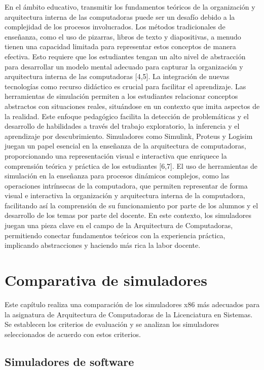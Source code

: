 \documentclass[12pt,twoside]{templates/unerthesis}
\begin{document}
En el ámbito educativo, transmitir los fundamentos teóricos de la organización y arquitectura interna de las computadoras puede ser un desafío debido a la complejidad de los procesos involucrados. Los métodos tradicionales de enseñanza, como el uso de pizarras, libros de texto y diapositivas, a menudo tienen una capacidad limitada para representar estos conceptos de manera efectiva. Esto requiere que los estudiantes tengan un alto nivel de abstracción para desarrollar un modelo mental adecuado para capturar la organización y arquitectura interna de las computadoras {[}4,5{]}.
La integración de nuevas tecnologías como recurso didáctico es crucial para facilitar el aprendizaje. Las herramientas de simulación permiten a los estudiantes relacionar conceptos abstractos con situaciones reales, situándose en un contexto que imita aspectos de la realidad. Este enfoque pedagógico facilita la detección de problemáticas y el desarrollo de habilidades a través del trabajo exploratorio, la inferencia y el aprendizaje por descubrimiento. Simuladores como Simulink, Proteus y Logisim juegan un papel esencial en la enseñanza de la arquitectura de computadoras, proporcionando una representación visual e interactiva que enriquece la comprensión teórica y práctica de los estudiantes {[}6,7{]}.
El uso de herramientas de simulación en la enseñanza para procesos dinámicos complejos, como las operaciones intrínsecas de la computadora, que permiten representar de forma visual e interactiva la organización y arquitectura interna de la computadora, facilitando así la comprensión de su funcionamiento por parte de los alumnos y el desarrollo de los temas por parte del docente. En este contexto, los simuladores juegan una pieza clave en el campo de la Arquitectura de Computadoras, permitiendo conectar fundamentos teóricos con la experiencia práctica, implicando abstracciones y haciendo más rica la labor docente.

\hypertarget{comparativa-de-simuladores}{%
\chapter{Comparativa de simuladores}\label{comparativa-de-simuladores}}

Este capítulo realiza una comparación de los simuladores x86 más adecuados para la asignatura de Arquitectura de Computadoras de la Licenciatura en Sistemas. Se establecen los criterios de evaluación y se analizan los simuladores seleccionados de acuerdo con estos criterios.

\hypertarget{simuladores-de-software}{%
\section{Simuladores de software}\label{simuladores-de-software}}
\end{document}
